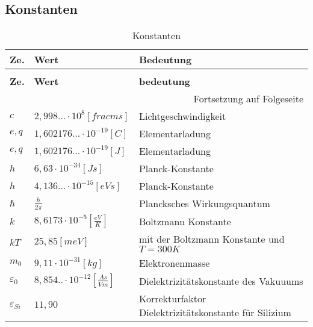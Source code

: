 \documentclass[12pt,a4paper]{report}%
\numberwithin{equation}{section}
\def\bracks#1{\left[ #1 \right]}
\numberwithin{equation}{section}
\begin{document}
	\subsection{Konstanten} \label{ch:constants}
	\renewcommand{\arraystretch}{1.5}
	
	\begin{longtable} {|p{0.6cm}|p{4.4cm}|p{8.4cm}|} \hline
	\textbf{Ze.} & \textbf{Wert} & \textbf{Bedeutung}\\
	\hline
	\endfirsthead %
	\caption{Konstanten}\\ \hline
	\textbf{Ze.} & \textbf{Wert} & \textbf{bedeutung}\\
	\hline
	\endhead %
	\multicolumn{3}{r}{Fortsetzung auf Folgeseite}\\
	\endfoot
	\hline
	\endlastfoot
	
	$c$ & $2,998...\cdot 10^8 \bracks{frac{m}{s}}$ & Lichtgeschwindigkeit\\ \hline
	$e,q$ & $1,602176...\cdot 10^{-19}\bracks{C}$ & Elementarladung\\ \hline
	$e,q$ & $1,602176...\cdot 10^{-19}\bracks{J}$ & Elementarladung\\ \hline
	$h$ & $6,63 \cdot 10^{-34} \bracks{Js}$ & Planck-Konstante\\ \hline
	$h$ & $4,136...\cdot 10^{-15} \bracks{eVs}$ & Planck-Konstante\\ \hline
	$\hbar$ & $\frac{h}{2\pi}$ & Plancksches Wirkungsquantum\\ \hline
	$k$ & $8,6173 \cdot 10^{-5} \bracks{\frac{eV}{K}}$ & Boltzmann Konstante\\ \hline
	$kT$ & $25,85 \bracks{meV}$ & mit der Boltzmann Konstante und $T=300K$ \\ \hline
	$m_0$ & $9,11 \cdot 10^{-31} \bracks{kg}$ & Elektronenmasse\\ \hline
	 
	
	$\varepsilon_0$ & $8,854..\cdot 10^{-12}\bracks{\frac{As}{Vm}}$ & Dielektrizitätskonstante des Vakuuums \\ \hline
	$\varepsilon_{Si}$ & $11,90$ & Korrekturfaktor Dielektrizitätskonstante für Silizium\\ \hline
	\end{longtable}
	\renewcommand{\arraystretch}{1}

\nocite{*}

\end{document}
